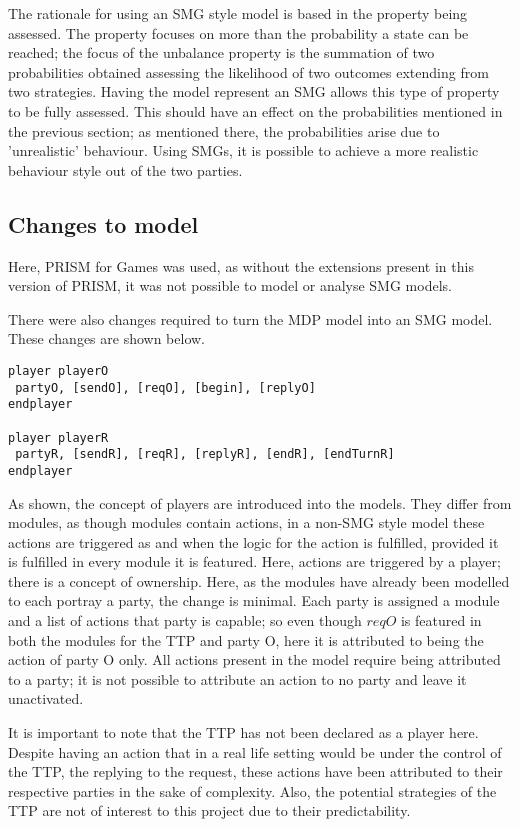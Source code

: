 \documentclass{l4proj}
\begin{document}
The rationale for using an SMG style model is based in the property being assessed. The property focuses on more than the probability a state can be reached; the focus of the unbalance property is the summation of two probabilities obtained assessing the likelihood of two outcomes extending from two strategies. Having the model represent an SMG allows this type of property to be fully assessed.
This should have an effect on the probabilities mentioned in the previous section; as mentioned there, the probabilities arise due to 'unrealistic' behaviour. Using SMGs, it is possible to achieve a more realistic behaviour style out of the two parties.

\subsection{Changes to model}

Here, PRISM for Games \cite{chen2013prism} was used, as without the extensions present in this version of PRISM, it was not possible to model or analyse SMG models.

There were also changes required to turn the MDP model into an SMG model. These changes are shown below.
\begin{lstlisting}
player playerO
 partyO, [sendO], [reqO], [begin], [replyO]
endplayer

player playerR
 partyR, [sendR], [reqR], [replyR], [endR], [endTurnR]
endplayer
\end{lstlisting}

As shown, the concept of players are introduced into the models. They differ from modules, as though modules contain actions, in a non-SMG style model these actions are triggered as and when the logic for the action is fulfilled, provided it is fulfilled in every module it is featured. Here, actions are triggered by a player; there is a concept of ownership. Here, as the modules have already been modelled to each portray a party, the change is minimal. Each party is assigned a module and a list of actions that party is capable; so even though $reqO$ is featured in both the modules for the TTP and party O, here it is attributed to being the action of party O only. All actions present in the model require being attributed to a party; it is not possible to attribute an action to no party and leave it unactivated.

It is important to note that the TTP has not been declared as a player here. Despite having an action that in a real life setting would be under the control of the TTP, the replying to the request, these actions have been attributed to their respective parties in the sake of complexity. Also, the potential strategies of the TTP are not of interest to this project due to their predictability.
\end{document}
